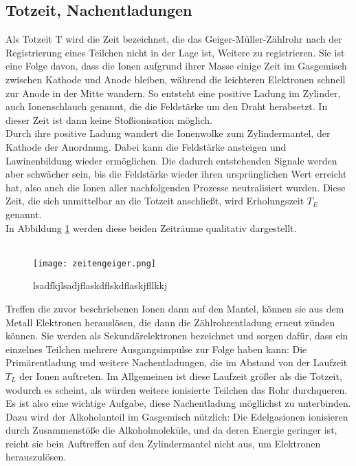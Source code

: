 \subsection{Totzeit, Nachentladungen}
Als Totzeit T wird die Zeit bezeichnet, die das Geiger-Müller-Zählrohr nach
der Registrierung eines Teilchen nicht in der Lage ist, Weitere zu registrieren.
Sie ist eine Folge davon, dass die Ionen aufgrund ihrer Masse einige Zeit im
Gasgemisch zwischen Kathode und Anode bleiben, während die leichteren Elektronen
schnell zur Anode in der Mitte wandern. So entsteht eine positive Ladung im 
Zylinder, auch Ionenschlauch genannt, die die Feldstärke um den Draht herabsetzt.
In dieser Zeit ist dann keine Stoßionisation möglich.\\
Durch ihre positive Ladung wandert die Ionenwolke zum Zylindermantel, der Kathode
der Anordnung. Dabei kann die Feldstärke ansteigen und Lawinenbildung wieder ermöglichen.
Die dadurch entstehenden Signale werden aber schwächer sein, bis die Feldstärke
wieder ihren ursprünglichen Wert erreicht hat, also auch die Ionen aller nachfolgenden
Prozesse neutralisiert wurden. Diese Zeit, die sich unmittelbar an die Totzeit
anschließt, wird Erholungszeit $T_E$ genannt.\\
In Abbildung \ref{fig:gramm} werden diese beiden Zeiträume qualitativ dargestellt.\\
\\
\begin{figure}
 \centering
 \texttt{[image: zeitengeiger.png]}
 \caption{lsadfkjlsadjflaskdflskdflaskjfllkkj}
 \label{fig:gramm}
\end{figure}
Treffen die zuvor beschriebenen Ionen dann auf den Mantel, können sie aus dem
Metall Elektronen herauslösen, die dann die Zählrohrentladung erneut zünden können.
Sie werden als Sekundärelektronen bezeichnet und sorgen dafür, dass ein einzelnes
Teilchen mehrere Ausgangsimpulse zur Folge haben kann: Die Primärentladung und
weitere Nachentladungen, die im Abstand von der Laufzeit $T_L$ der Ionen 
auftreten. Im Allgemeinen ist diese Laufzeit größer als die Totzeit, wodurch es
scheint, als würden weitere ionisierte Teilchen das Rohr durchqueren.\\
Es ist also eine wichtige Aufgabe, diese Nachentladung mögllichst zu unterbinden.
Dazu wird der Alkoholanteil im Gasgemisch nützlich: Die Edelgasionen 
ionisieren durch Zusammenstöße die Alkoholmoleküle, und da deren Energie 
geringer ist, reicht sie bein Auftreffen auf den Zylindermantel nicht aus,
um Elektronen herauszulösen. 

